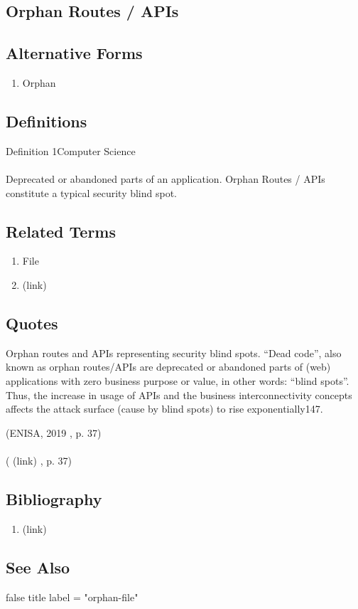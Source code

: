 \newpage \subsection*{Orphan Routes / APIs } \subsection*{Alternative Forms } \begin{enumerate} \item  Orphan  \end{enumerate} \subsection*{Definitions } \begin{DIC_Def}{Definition 1Computer Science }{} \paragraph{} Deprecated or abandoned parts of an application. Orphan Routes / APIs constitute a typical security blind spot.  \end{DIC_Def} \subsection*{Related Terms } \begin{enumerate} \item  File  \item  (link) \href{Orphan (Dictionary Entry) }{ }   \end{enumerate} \subsection*{Quotes } \begin{DIC_BlockQuote} Orphan routes and APIs representing security blind spots. ``Dead code'', also known as orphan routes/APIs are deprecated or abandoned parts of (web) applications with zero business purpose or value, in other words: ``blind spots''. Thus, the increase in usage of APIs and the business interconnectivity concepts affects the attack surface (cause by blind spots) to rise exponentially147.  \end{DIC_BlockQuote} (ENISA, 2019 , p. 37)  \paragraph{} (  (link) \href{ENISA, 2019 }{ } , p. 37)  \subsection*{Bibliography } \begin{enumerate} \item  (link) \href{ENISA, 2019 }{ }   \end{enumerate} \subsection*{See Also } false  title  label = "orphan-file"  